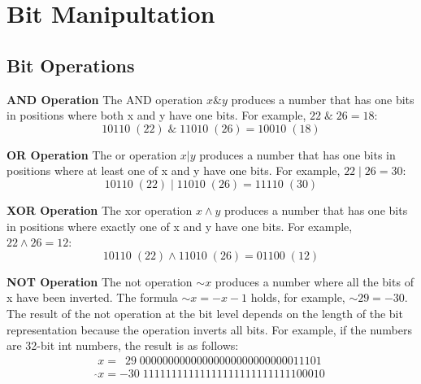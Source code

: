 \section{Bit Manipultation}
\subsection*{Bit Operations}
 
\par \textbf{AND Operation} The AND operation $x\&y$ produces a number that has one bits in positions where both x and y have one bits. For example, $22\;\&\;26 = 18$: 
$$10110\; (22)\; \boldsymbol{\&} \; 11010\;(26) = 10010\; (18)$$

\par \textbf{OR Operation} The or operation $x|y$ produces a number that has one bits in positions where at least one of x and y have one bits. For example, $22\;|\;26 = 30$: 
$$10110\; (22)\; \boldsymbol{|} \; 11010\;(26) = 11110\; (30)$$

\par \textbf{XOR Operation} The xor operation $x \wedge y$ produces a number that has one bits in positions where exactly one of x and y have one bits. For example, $22 \wedge 26 = 12$:
$$10110\;(22) \wedge 11010\;(26) = 01100\;(12)$$

\par \textbf{NOT Operation} The not operation $\sim x$ produces a number where all the bits of x have been inverted. The formula $\sim x = -x -1$ holds, for example, $\sim 29 = -30$. The result of the not operation at the bit level depends on the length of the bit representation because the operation inverts all bits. For example, if the numbers are 32-bit int numbers, the result is as follows:
\begin{gather*}
x = \ \;29\; 00000000000000000000000000011101 \\ 
\hat{}x = -30\; 11111111111111111111111111100010
\end{gather*}